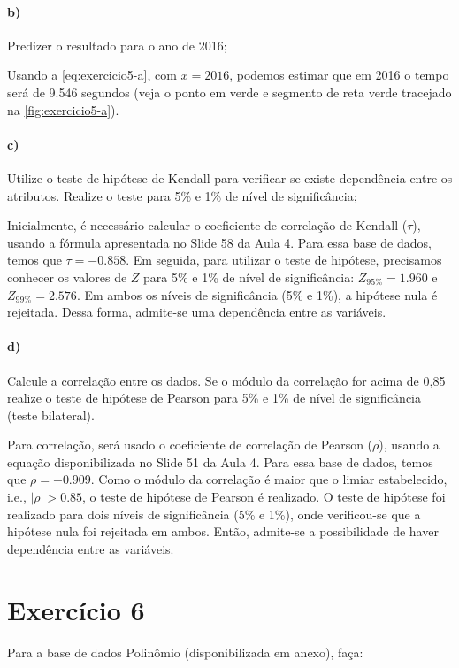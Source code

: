 \documentclass{article}
\begin{document}
\paragraph{b)} Predizer o resultado para o ano de 2016;

Usando a \autoref{eq:exercicio5-a}, com $x=2016$, podemos estimar que em 2016 o tempo será de 9.546 segundos (veja o ponto em verde e segmento de reta verde tracejado na \autoref{fig:exercicio5-a}).

\paragraph{c)} Utilize o teste de hipótese de Kendall para verificar se existe dependência entre os atributos. Realize o teste para 5\% e 1\% de nível de significância;

Inicialmente, é necessário calcular o coeficiente de correlação de Kendall ($\tau$), usando a fórmula apresentada no Slide 58 da Aula 4. Para essa base de dados, temos que $\tau = -0.858$. Em seguida, para utilizar o teste de hipótese, precisamos conhecer os valores de $Z$ para 5\% e 1\% de nível de significância: $Z_{95\%}=1.960$ e $Z_{99\%}=2.576$. Em ambos os níveis de significância (5\% e 1\%), a hipótese nula é rejeitada. Dessa forma, admite-se uma dependência entre as variáveis.

\paragraph{d)} Calcule a correlação entre os dados. Se o módulo da correlação for acima de 0,85
realize o teste de hipótese de Pearson para 5\% e 1\% de nível de significância (teste
bilateral).

Para correlação, será usado o coeficiente de correlação de Pearson ($\rho$), usando a equação disponibilizada no Slide 51 da Aula 4. Para essa base de dados, temos que $\rho = -0.909$. Como o módulo da correlação é maior que o limiar estabelecido, i.e., $|\rho| > 0.85$, o teste de hipótese de Pearson é realizado. O teste de hipótese foi realizado para dois níveis de significância (5\% e 1\%), onde verificou-se que a hipótese nula foi rejeitada em ambos. Então, admite-se a possibilidade de haver dependência entre as variáveis.

\section{Exercício 6}
Para a base de dados Polinômio (disponibilizada em anexo), faça:
\end{document}
